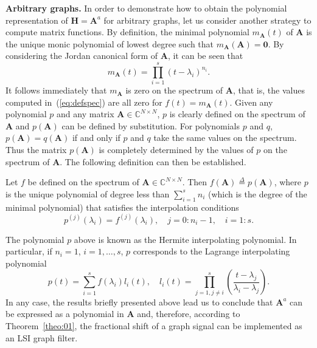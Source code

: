 \noindent\textbf{Arbitrary graphs.} In order to demonstrate how to obtain the polynomial representation of $\mathbf{H}=\mathbf{A}^a$ for arbitrary graphs, let us consider another strategy to compute matrix functions. By definition, the minimal polynomial $m_{\mathbf{A}}(t)$ of $\mathbf{A}$ is the unique monic polynomial of lowest degree such that $m_{\mathbf{A}}(\mathbf{A})=\mathbf{0}$. By considering the Jordan canonical form of $\mathbf{A}$, it can be seen that
\begin{equation}
    m_{\mathbf{A}}(t)=\prod_{i=1}^s (t-\lambda_i)^{n_i}.
\end{equation}
It follows immediately that $m_{\mathbf{A}}$ is zero on the spectrum of $\mathbf{A}$, that is, the values computed in~(\ref{eq:defspec}) are all zero for $f(t)=m_{\mathbf{A}}(t)$. Given any polynomial $p$ and any matrix $\mathbf{A}\in\mathbb{C}^{N\times N}$, $p$ is clearly defined on the spectrum of $\mathbf{A}$ and $p(\mathbf{A})$ can be defined by substitution. For polynomials $p$ and $q$, $p(\mathbf{A})=q(\mathbf{A})$ if and only if $p$ and $q$ take the same values on the spectrum. Thus the matrix $p(\mathbf{A})$ is completely determined by the values of $p$ on the spectrum of $\mathbf{A}$. The following definition can then be established.
\vspace{0.2cm}
\begin{definition}\label{def:jc02}
    Let $f$ be defined on the spectrum of $\mathbf{A}\in\mathbb{C}^{N\times N}$. Then $f(\mathbf{A})\overset{\Delta}{=}p(\mathbf{A})$, where $p$ is the unique polynomial of degree less than $\sum_{i=1}^s n_i$ (which is the degree of the minimal polynomial) that satisfies the interpolation conditions
    \begin{equation}
        p^{(j)}(\lambda_i)=f^{(j)}(\lambda_i),\quad j=0:n_i-1,\quad i=1:s.
    \end{equation}
\end{definition}

The polynomial $p$ above is known as the Hermite interpolating polynomial. In particular, if $n_i=1$, $i=1,\ldots,s$, $p$ corresponds to the Lagrange interpolating polynomial
\begin{equation}
    p(t)=\sum_{i=1}^s f(\lambda_i)l_i(t),\quad l_i(t)=\prod_{j=1,j\neq i}^s \left(\frac{t-\lambda_j}{\lambda_i-\lambda_j}\right).
\end{equation}
In any case, the results briefly presented above lead us to conclude that $\mathbf{A}^a$ can be expressed as a polynomial in $\mathbf{A}$ and, therefore, according to Theorem~\ref{theo:01}, the fractional shift of a graph signal can be implemented as an LSI graph filter.

